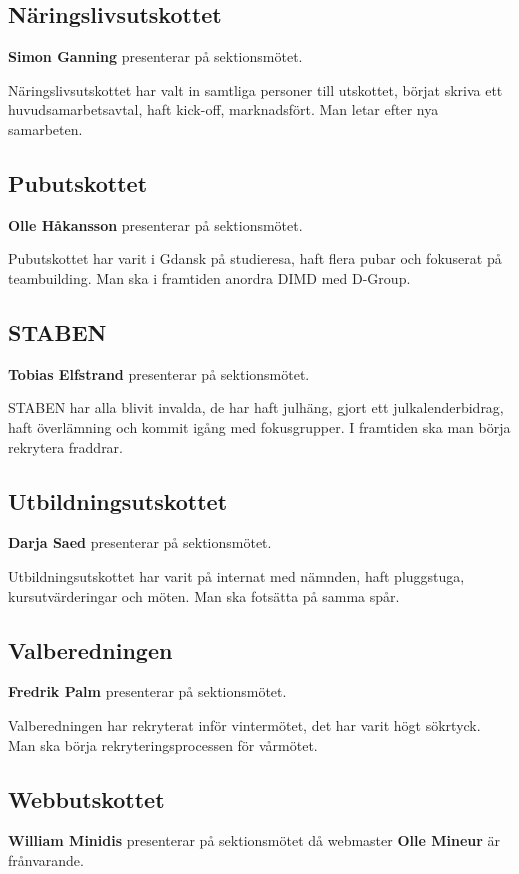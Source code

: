 \documentclass[../protokoll-vintermote-2024.tex]{subfiles}
\begin{document}
\subsection{Näringslivsutskottet}
\textbf{Simon Ganning} presenterar på sektionsmötet.

Näringslivsutskottet har valt in samtliga personer till utskottet, börjat skriva ett huvudsamarbetsavtal, haft kick-off, marknadsfört. Man letar efter nya samarbeten.

\subsection{Pubutskottet}
\textbf{Olle Håkansson} presenterar på sektionsmötet.

Pubutskottet har varit i Gdansk på studieresa, haft flera pubar och fokuserat på teambuilding. Man ska i framtiden anordra DIMD med D-Group.

\subsection{STABEN}
\textbf{Tobias Elfstrand} presenterar på sektionsmötet.

STABEN har alla blivit invalda, de har haft julhäng, gjort ett julkalenderbidrag, haft överlämning och kommit igång med fokusgrupper. I framtiden ska man börja rekrytera fraddrar.

\subsection{Utbildningsutskottet}
\textbf{Darja Saed} presenterar på sektionsmötet. 

Utbildningsutskottet har varit på internat med nämnden, haft pluggstuga, kursutvärderingar och möten. Man ska fotsätta på samma spår.
 
\subsection{Valberedningen}
\textbf{Fredrik Palm} presenterar på sektionsmötet.

Valberedningen har rekryterat inför vintermötet, det har varit högt sökrtyck. Man ska börja rekryteringsprocessen för vårmötet.

\subsection{Webbutskottet}
\textbf{William Minidis} presenterar på sektionsmötet då webmaster \textbf{Olle Mineur} är frånvarande.
\end{document}
